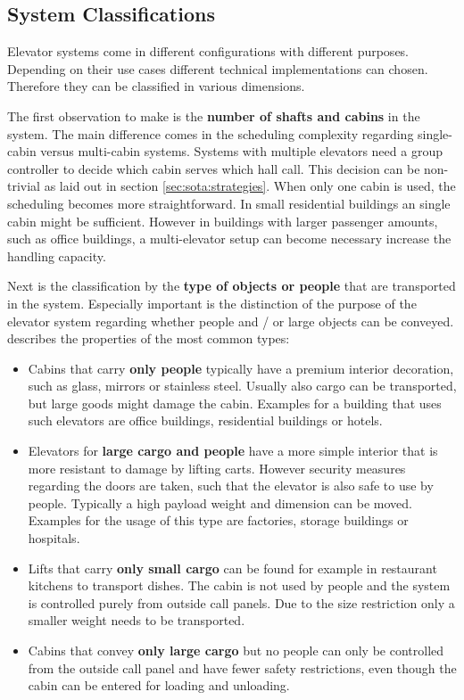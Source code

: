 \subsection{System Classifications}

Elevator systems come in different configurations with different purposes.
Depending on their use cases different technical implementations can chosen.
Therefore they can be classified in various dimensions.

The first observation to make is the \textbf{number of shafts and cabins} in the system.
The main difference comes in the scheduling complexity regarding single-cabin versus multi-cabin systems.
Systems with multiple elevators need a group controller to decide which cabin serves which hall call.
This decision can be non-trivial as laid out in section \vref{sec:sota:strategies}.
When only one cabin is used, the scheduling becomes more straightforward.
In small residential buildings an single cabin might be sufficient.
However in buildings with larger passenger amounts, such as office buildings, a multi-elevator setup can become necessary increase the handling capacity.

Next is the classification by the \textbf{type of objects or people} that are transported in the system. Especially important is the distinction of the purpose of the elevator system regarding whether people and / or large objects can be conveyed.
\textcite[][pp.~141--158]{unger2015aufzuege} describes the properties of the most common types:

\begin{itemize}
    \item Cabins that carry \textbf{only people} 
    typically have a premium interior decoration, such as glass, mirrors or stainless steel.
    Usually also cargo can be transported, but large goods might damage the cabin.
    Examples for a building that uses such elevators are office buildings, residential buildings or hotels.
    
    \item Elevators for \textbf{large cargo and people} 
    have a more simple interior that is more resistant to damage by lifting carts. 
    However security measures regarding the doors are taken, such that the elevator is also safe to use by people. 
    Typically a high payload weight and dimension can be moved.
    Examples for the usage of this type are factories, storage buildings or hospitals. 
    
    \item Lifts that carry \textbf{only small cargo} can be found for example in restaurant kitchens to transport dishes.
    The cabin is not used by people and the system is controlled purely from outside call panels. 
    Due to the size restriction only a smaller weight needs to be transported.
    
    \item Cabins that convey \textbf{only large cargo} but no people can only be controlled from the outside call panel and have fewer safety restrictions, even though the cabin can be entered for loading and unloading. 
\end{itemize}

